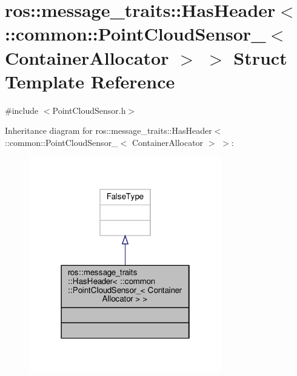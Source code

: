\hypertarget{structros_1_1message__traits_1_1HasHeader_3_01_1_1common_1_1PointCloudSensor___3_01ContainerAllocator_01_4_01_4}{}\section{ros\+:\+:message\+\_\+traits\+:\+:Has\+Header$<$ \+:\+:common\+:\+:Point\+Cloud\+Sensor\+\_\+$<$ Container\+Allocator $>$ $>$ Struct Template Reference}
\label{structros_1_1message__traits_1_1HasHeader_3_01_1_1common_1_1PointCloudSensor___3_01ContainerAllocator_01_4_01_4}


{\ttfamily \#include $<$Point\+Cloud\+Sensor.\+h$>$}



Inheritance diagram for ros\+:\+:message\+\_\+traits\+:\+:Has\+Header$<$ \+:\+:common\+:\+:Point\+Cloud\+Sensor\+\_\+$<$ Container\+Allocator $>$ $>$\+:\nopagebreak
\begin{figure}[H]
\begin{center}
\leavevmode
\includegraphics[width=238pt]{dc/d7c/structros_1_1message__traits_1_1HasHeader_3_01_1_1common_1_1PointCloudSensor___3_01ContainerAllocator_01_4_01_4__inherit__graph}
\end{center}
\end{figure}


